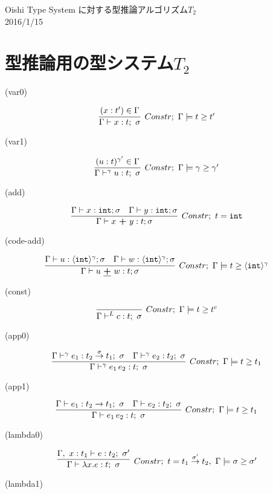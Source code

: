 \documentclass[dvipdfmx]{jsarticle}
\newcommand\longer[2]{{#1} \ord {#2}}
\begin{document}
\begin{center}
  Oishi Type System に対する型推論アルゴリズム$T_2$ \\
  2016/1/15
\end{center}

\section{型推論用の型システム$T_2$}

(var0)

\[
  \infer[Constr;~\Gamma \models \longer{t}{t'}]
  {\Gamma \vdash x:t;~\sigma}
  {(x:t') \in \Gamma
  }
\]

(var1)

\[
  \infer[Constr;~\Gamma \models \longer{\gamma}{\gamma'}]
  {\Gamma \vdash^{\gamma} u:t;~\sigma}
  {(u:t)^{\gamma'} \in \Gamma
  }
\]

(add)

\[
  \infer[Constr;~ t = \intT]
  {\Gamma \vdash x~ \Plus~ y: t; \sigma}
  {\Gamma \vdash x: \intT ; \sigma & \Gamma \vdash y: \intT ; \sigma}
\]

(code-add)

\[
  \infer[Constr;~ \Gamma \models \longer{t}{\codeT{\intT}{\gamma}}]
  {\Gamma \vdash u~ \cPlus~ w: t; \sigma}
  {\Gamma \vdash u: \codeT{\intT}{\gamma}; \sigma & \Gamma \vdash w: \codeT{\intT}{\gamma}; \sigma}
\]

(const)

\[
  \infer[Constr;~\Gamma \models \longer{t}{t^c}]
  {\Gamma \vdash^{L} c:t;~\sigma}
  {}
\]

(app0)

\[
  \infer[Constr;~\Gamma \models \longer{t}{t_1}]
  {\Gamma \vdash^\gamma e_1 \, e_2 : t;~\sigma}
  {\Gamma \vdash^\gamma e_1 : \funT{t_2}{t_1}{\sigma};~\sigma
    &\Gamma \vdash^\gamma e_2 : t_2;~\sigma
  }
\]

(app1)

\[
  \infer[Constr;~\Gamma \models \longer{t}{t_1}]
  {\Gamma \vdash e_1 \, e_2 : t;~\sigma}
  {\Gamma \vdash e_1 : t_2 \to t_1;~\sigma
    &\Gamma \vdash e_2 : t_2;~\sigma
  }
\]

(lambda0)

\[
  \infer[Constr;~t=\funT{t_1}{t_2}{\sigma'},~ \Gamma \models \sigma \ord \sigma' ]
  {\Gamma \vdash \lambda x.e : t;~\sigma}
  {\Gamma,~x:t_1 \vdash e : t_2;~\sigma'}
\]

(lambda1)
\end{document}
